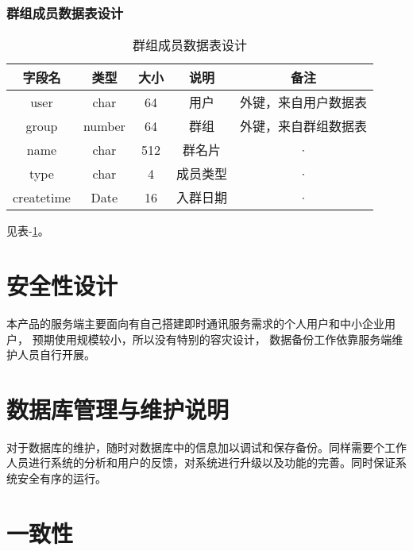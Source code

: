\subsubsection{群组成员数据表设计}
\begin{table}[htbp]
	\centering
	\caption{群组成员数据表设计} \label{tab:usergroup-database}
	\begin{tabular}{|c|c|c|c|c|}
		\hline
		字段名     & 类型 & 大小 & 说明     & 备注                 \\
		\hline
		user       & char & 64   & 用户     & 外键，来自用户数据表 \\
		\hline
		group       & number & 64   & 群组     & 外键，来自群组数据表 \\
		\hline
		name       & char & 512  & 群名片   & ·                    \\
		\hline
		type       & char & 4    & 成员类型 & ·                    \\
		\hline
		createtime & Date & 16   & 入群日期 & ·                    \\
		\hline
	\end{tabular}
\end{table}
见表-\ref{tab:usergroup-database}。


\section{安全性设计}
本产品的服务端主要面向有自己搭建即时通讯服务需求的个人用户和中小企业用户，
预期使用规模较小，所以没有特别的容灾设计，
数据备份工作依靠服务端维护人员自行开展。

\section{数据库管理与维护说明}
对于数据库的维护，随时对数据库中的信息加以调试和保存备份。同样需要个工作人员进行系统的分析和用户的反馈，对系统进行升级以及功能的完善。同时保证系统安全有序的运行。

{\color{red}
\section{一致性}

}

